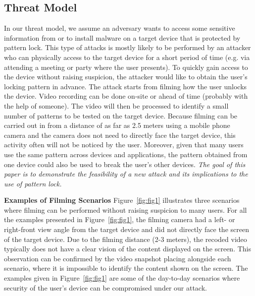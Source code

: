     \subsection{Threat Model}
    \label{sec:scenarios}
        In our threat model, we assume an adversary wants to access some sensitive information from or to install malware on a target device that is protected by pattern lock.
        This type of attacks is mostly likely to be performed by an attacker
         who can physically access to the
        target device for a short period of time (e.g. via  attending a meeting or party where the user presents). To quickly gain access to the device without raising suspicion, the attacker would like to obtain the user's locking
        pattern in advance. %
        The attack starts from filming how the user unlocks the device. Video recording can be done on-site or ahead of time (probably with the help of someone).
        The video will then be processed to identify a small number of patterns to be tested on the target device.
        Because filming can be carried out in from a distance of as far as 2.5 meters using a mobile phone camera and the camera does not need to directly face the target device, this activity often will not be noticed by the user.
        Moreover, given that many users
         use the same pattern across devices and applications, the pattern obtained from one device could also be used to break the user's other devices.  \emph{The goal of this paper is to
        demonstrate the feasibility of a new attack and its implications to
        the use of pattern lock.}

        \noindent \textbf{Examples of Filming Scenarios} Figure~\ref{fig:fig1} illustrates three scenarios where filming can be
        performed without raising suspicion to many users. For all the examples presented in Figure~\ref{fig:fig1}, the
        filming camera had a left- or right-front view angle from the target device and did not directly face the screen of the target device. Due to the filming distance (2-3 meters), the recoded video typically does not have a clear vision of
        the content displayed on the screen.  This observation can be confirmed by the video snapshot placing
        alongside each scenario, where it is impossible to identify the content shown on the screen.
        The examples given in Figure~\ref{fig:fig1} are some of the day-to-day
        scenarios where security of the user's device can be compromised under
        our attack.

